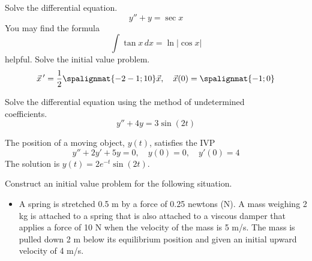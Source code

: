 \documentclass[12pt]{exam}
\begin{document}
    


\newpage


\begin{questions}


    \question[10]  Solve the differential equation. $$y''+y = \sec x$$
    You may find the formula $$\int \tan x \, dx = \ln |\cos x|$$ helpful. 
    \newpage
    \question[10] Solve the initial value problem. 
    $$\vec x \, ' = \frac 1 2 \spalignmat{-2 -1;1 0} \vec x, \quad \vec x (0) = \spalignmat{-1 ;0}$$

    \newpage
    
    \question[8] Solve the differential equation using the method of undetermined \\coefficients. $$y'' + 4y = 3 \sin(2t)$$
    

    \newpage 
    

    \vspace{4cm} 
    
    \question[8] The position of a moving object, $y(t)$, satisfies the IVP $$y''+2y'+5y=0, \quad y(0) = 0, \quad y'(0) = 4$$ The solution is $y(t)= 2e^{-t}\sin(2t)$. 
    
    
    \newpage
    \question[4]  Construct an initial value problem for the following situation. 

    \begin{itemize}
        \item[] A spring is stretched 0.5 m by a force of 0.25 newtons (N). A mass weighing 2 kg is attached to a spring that is also attached to a viscous damper that applies a force of 10 N when the velocity of the mass is 5 m/s. The mass is pulled down 2 m below its equilibrium position and given an initial upward velocity of 4 m/s. 
    \end{itemize}
    

\end{questions}
\end{document}
